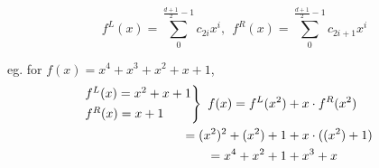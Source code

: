 \documentclass{article}
\theoremstyle{definition}
\begin{document}

$$f^L(x)= \sum_0^{\frac{d+1}{2}-1} c_{2i} x^i ,~~ f^R(x)= \sum_0^{\frac{d+1}{2}-1} c_{2i+1} x^i$$

eg. for $f(x)=x^4+x^3+x^2+x+1$,
\begin{align*}
	\begin{rcases}
	f^L(x)=x^2+x+1\\
	f^R(x)=x+1
	\end{rcases}
	~f(x) = f^L(x^2) &+ x \cdot f^R(x^2)\\
	= (x^2)^2 + (x^2) + 1 &+ x \cdot ((x^2) + 1)\\
	= x^4 + x^2 + 1 &+ x^3 + x
\end{align*}

% 
% 
\end{document}
